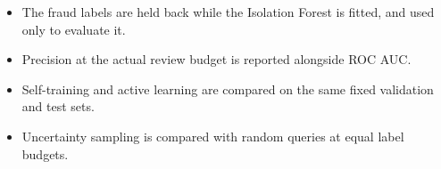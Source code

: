 \begin{verification}
\begin{itemize}
  \item The fraud labels are held back while the Isolation Forest is fitted, and used only to evaluate it.
  \item Precision at the actual review budget is reported alongside ROC AUC.
  \item Self-training and active learning are compared on the same fixed validation and test sets.
  \item Uncertainty sampling is compared with random queries at equal label budgets.
\end{itemize}
\end{verification}

